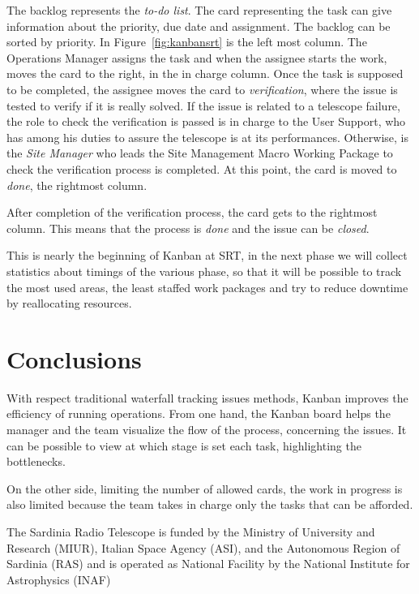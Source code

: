 \documentclass[a4paper]{spie}  %
\begin{document}
The backlog represents the\textit{ to-do list}. The card representing the task can give information about the priority, due date and assignment.
The backlog can be sorted by priority. In Figure~\ref{fig:kanbansrt} is the left most column. The Operations Manager assigns the task and when the assignee starts the work, moves the card to the right, in the {in charge} column. Once the task is supposed to be completed, the assignee moves the card to \textit{verification}, where the issue is tested to verify if it is really  solved. If the issue is  related to a telescope failure, the role to check the verification is passed is in charge to the User Support, who has among his duties to assure the  telescope is at its performances. Otherwise, is the \textit{Site Manager} who leads the Site Management Macro Working Package to check the verification process is completed. At this point, the card is moved to \textit{done}, the rightmost column. 

After completion of the verification process, the card gets to the rightmost column. 
This means that the process is  \textit{done} and the issue can be \textit{closed}.

This is nearly the beginning of Kanban at SRT, in the next phase we will collect statistics about timings of the various phase, so that it will be possible to track the most used areas, the least staffed work packages and try to reduce downtime by reallocating resources.



\section{Conclusions}

With respect traditional waterfall tracking issues methods, Kanban improves the efficiency of running operations.
From one hand, the Kanban board helps the manager and the team  visualize the flow of the process, concerning the issues. It can be possible to view at which stage is set each task, highlighting the bottlenecks.

On the other side, limiting the number of allowed cards, the work in progress is also limited because the team takes in charge only the tasks that  can be afforded.
 
\acknowledgments %


 
The Sardinia Radio Telescope is funded by the Ministry of University and Research (MIUR), Italian Space Agency (ASI), and the Autonomous Region of Sardinia (RAS) and is operated as National Facility by the National Institute for Astrophysics (INAF)

\end{document}
